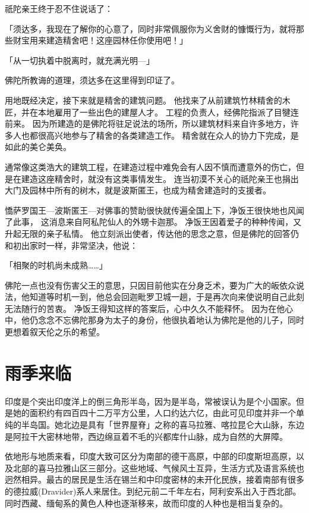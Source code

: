 \documentclass[twoside,openany]{book}
\begin{document}
祇陀亲王终于忍不住说话了：

「须达多，我现在了解你的心意了，同时非常佩服你为义舍财的慷慨行为，就将那些财宝用来建造精舍吧！这座园林任你使用吧！」

「从一切执着中脱离时，就充满光明---」

佛陀所教诲的道理，须达多在这里得到印证了。

用地既经决定，接下来就是精舍的建筑问题。
他找来了从前建筑竹林精舍的木匠，并在本地雇用了一些出色的建屋人才。
工程的负责人，经佛陀指派了目犍连前来。
因为所建造的是佛陀将驻足说法的场所，所以建筑材料来自许多地方，许多人也都很高兴地参与了精舍的各类建造工作。
精舍就在众人的协力下完成，是如此的美仑美奂。

通常像这类浩大的建筑工程，在建造过程中难免会有人因不慎而遭意外的伤亡，但是在建造这座精舍时，就没有这类事情发生。
连当初漠不关心的祇陀亲王也捐出大门及园林中所有的树木，就是波斯匿王，也成为精舍建造时的支援者。

憍萨罗国王---波斯匿王---对佛事的赞助很快就传遍全国上下，净饭王很快地也风闻了此事，
这消息来自阿私陀仙人的外甥卡迦那。
净饭王因着爱子的种种传闻，又升起无限的亲子私情。
他立刻派出使者，传达他的思念之意，但是佛陀的回答仍和初出家时一样，非常坚决，他说：

「相聚的时机尚未成熟……」

佛陀一点也没有伤害父王的意思，只因目前他实在分身乏术，要为广大的皈依众说法，他知道等时机一到，他总会回迦毗罗卫城一趟，于是再次向来使说明自己此刻无法随行的苦衷。
净饭王得知这样的答案后，心中久久不能释怀。
因为在他心中，他仍念念不忘佛陀那身为太子的身份，他很执着地认为佛陀是他的儿子，同时更想着叙天伦之乐的希望。

\section{雨季来临}\label{sec6.2}

印度是个突出印度洋上的倒三角形半岛，因为是半岛，常被误认为是个小国家。但是她的面积约有四百四十二万平方公里，人口约达六亿，由此可见印度并非一个单纯的半岛国。她北边是具有「世界屋脊」之称的喜马拉雅、喀拉昆仑大山脉，东边是阿拉干大密林地带，西边绵亘着不毛的兴都库什山脉，成为自然的大屏障。

依地形与地质来看，印度大致可区分为南部的德干高原，中部的印度斯坦高原，以及北部的喜马拉雅山区三部分。这些地域、气候风土互异，生活方式及语言系统也迥然相异。最古的居民是生活在锡兰和中印度密林的未开化民族，接着南部有很多的德拉威(Dravider)系人来居住。到纪元前二千年左右，阿利安系出入于西北部。同时西藏、缅甸系的黄色人种也逐渐移来，故而印度的人种也是相当复杂的。
\end{document}
